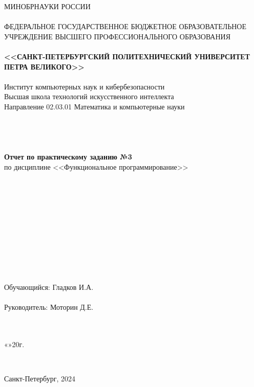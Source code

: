\documentclass[10pt,a4paper,final]{article} %
\begin{document}
\thispagestyle{empty}

\begin{center}
	{\Large МИНОБРНАУКИ РОССИИ}\\
	~\\
	{\large ФЕДЕРАЛЬНОЕ ГОСУДАРСТВЕННОЕ БЮДЖЕТНОЕ ОБРАЗОВАТЕЛЬНОЕ УЧРЕЖДЕНИЕ ВЫСШЕГО ПРОФЕССИОНАЛЬНОГО ОБРАЗОВАНИЯ}\\
	~\\
	{\Large \bf <<САНКТ-ПЕТЕРБУРГСКИЙ ПОЛИТЕХНИЧЕСКИЙ УНИВЕРСИТЕТ ПЕТРА ВЕЛИКОГО>>}\\
	~\\
	{\large Институт компьютерных наук и кибербезопасности}\\
	{\large Высшая школа технологий искусственного интеллекта}\\
	{\large Направление 02.03.01 Математика и компьютерные науки}\\
	~\\
	~\\
	~\\
	~\\
	{\Large \bf Отчет по практическому заданию №3}\\
	{\Large по дисциплине <<Функциональное программирование>> }\\
	~\\
	~\\
	
	
	~\\
	~\\
	~\\
	~\\
	~\\
	~\\
	~\\
	~\\
	~\\
	{\large Обучающийся: \underline{\hspace{3.5cm}} \qquad\qquad Гладков И.А.}\\
	~\\
	{\large Руководитель: \underline{\hspace{3.5cm}} \hspace{15mm} Моторин Д.Е.}\\
	~\\
	~\\
\end{center}
\begin{flushright}
	
	«\underline{\hspace{1cm}}»\underline{\hspace{3cm}}20\underline{\hspace{0.7cm}}г.
\end{flushright}
~\\
\begin{center}
	{\large Санкт-Петербург, 2024}
\end{center}
\newpage
\end{document}
